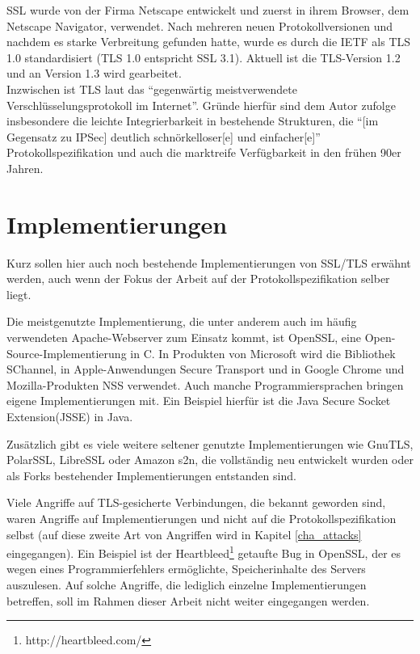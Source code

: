 SSL wurde von der Firma Netscape entwickelt und zuerst in ihrem Browser, dem Netscape Navigator, verwendet. Nach mehreren neuen Protokollversionen und nachdem es starke Verbreitung gefunden hatte, wurde es durch die IETF als TLS 1.0 standardisiert (TLS 1.0 entspricht SSL 3.1). Aktuell ist die TLS-Version 1.2 und an Version 1.3 wird gearbeitet.\\
Inzwischen ist TLS laut \cite{schmeh09} das "`gegenwärtig meistverwendete Verschlüsselungsprotokoll im Internet"'. Gründe hierfür sind dem Autor zufolge insbesondere die leichte Integrierbarkeit in bestehende Strukturen, die "`[im Gegensatz zu IPSec] deutlich schnörkelloser[e] und einfacher[e]"' Protokollspezifikation und auch die marktreife Verfügbarkeit in den frühen 90er Jahren.

\section{Implementierungen}

Kurz sollen hier auch noch bestehende Implementierungen von SSL/TLS erwähnt werden, auch wenn der Fokus der Arbeit auf der Protokollspezifikation selber liegt.

Die meistgenutzte Implementierung, die unter anderem auch im häufig verwendeten Apache-Webserver zum Einsatz kommt, ist OpenSSL, eine Open-Source-Implementierung in C. In Produkten von Microsoft wird die Bibliothek SChannel, in Apple-Anwendungen Secure Transport und in Google Chrome und Mozilla-Produkten NSS verwendet. Auch manche Programmiersprachen bringen eigene Implementierungen mit. Ein Beispiel hierfür ist die Java Secure Socket Extension(JSSE) in Java.

Zusätzlich gibt es viele weitere seltener genutzte Implementierungen wie GnuTLS, PolarSSL, LibreSSL oder Amazon s2n, die vollständig neu entwickelt wurden oder als Forks bestehender Implementierungen entstanden sind.

Viele Angriffe auf TLS-gesicherte Verbindungen, die bekannt geworden sind, waren Angriffe auf Implementierungen und nicht auf die Protokollspezifikation selbst (auf diese zweite Art von Angriffen wird in Kapitel \ref{cha_attacks} eingegangen). Ein Beispiel ist der Heartbleed\footnote{http://heartbleed.com/} getaufte Bug in OpenSSL, der es wegen eines Programmierfehlers ermöglichte, Speicherinhalte des Servers auszulesen. Auf solche Angriffe, die lediglich einzelne Implementierungen betreffen, soll im Rahmen dieser Arbeit nicht weiter eingegangen werden.

